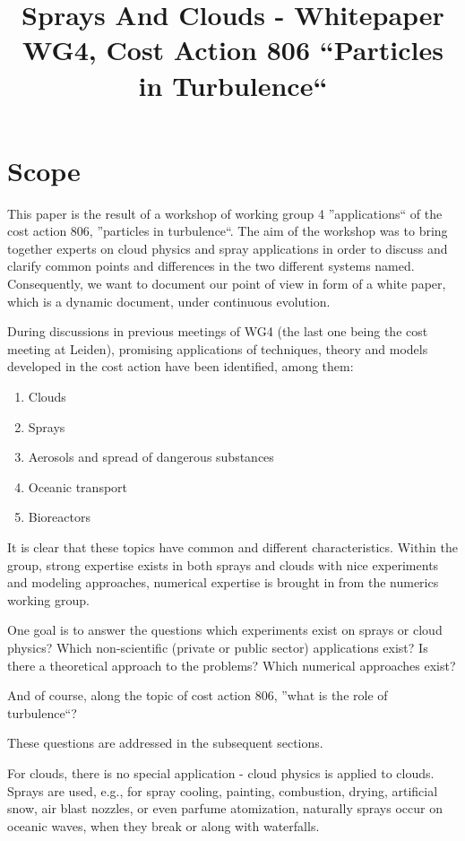 \documentclass{report}
\title{Sprays And Clouds - Whitepaper WG4, Cost Action 806 ``Particles in Turbulence``}
\begin{document}
 
\maketitle

\chapter{Scope}
This paper is the result of a workshop of working group 4 ''applications`` of the 
cost action 806, ''particles  in turbulence``. The aim of the workshop was to 
bring together experts on cloud physics and spray applications in order to 
discuss and clarify common points and differences in the two different systems
named. Consequently, we want to document our point of view in form of a white 
paper, which is a dynamic document, under continuous evolution.

During discussions in previous meetings of WG4 (the last one being the cost meeting at Leiden), 
promising applications of techniques, theory and models developed 
in the cost action have been identified, among them:
\begin{enumerate}
 \item Clouds
 \item Sprays
 \item Aerosols and spread of dangerous substances
 \item Oceanic transport
 \item Bioreactors
\end{enumerate}

It is clear that these topics have common and different characteristics. Within the
group, strong expertise exists in both sprays and clouds with nice experiments
and modeling approaches, numerical expertise is brought in from the numerics working group. 

One goal is to answer the questions
which experiments exist on sprays or cloud physics? Which non-scientific 
(private or public sector) applications exist? Is there a theoretical approach to 
the problems? Which numerical approaches exist?

And of course, along the topic of cost action 806, ''what is the role of 
turbulence``?

These questions are addressed in the subsequent sections.

For clouds, there is no special application - cloud physics is applied to clouds.
Sprays are used, e.g., for spray cooling, painting, combustion, drying, artificial snow, 
air blast nozzles, or even parfume
atomization, naturally sprays occur on oceanic waves, when they break or 
along with waterfalls.
\end{document}
